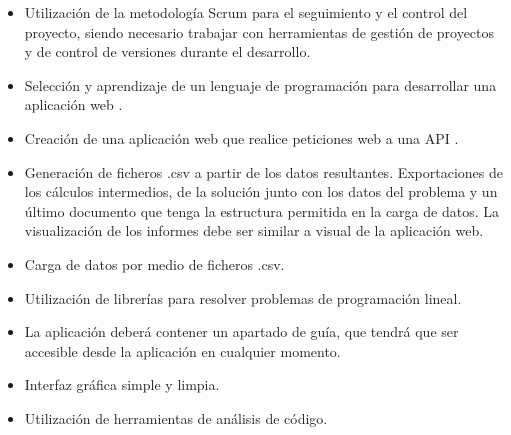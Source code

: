 \begin{itemize}
    \item Utilización de la metodología Scrum para el seguimiento y el control del proyecto, siendo necesario trabajar con herramientas de gestión de proyectos y de control de versiones durante el desarrollo.
    \item Selección y aprendizaje de un lenguaje de programación para desarrollar una aplicación web .
	\item Creación de una aplicación web que realice  peticiones web a una API .
	\item Generación de ficheros .csv a partir de los  datos resultantes. Exportaciones de los cálculos intermedios, de la solución  junto con los datos del problema y un último documento que tenga la estructura permitida en la carga de datos. La visualización de los informes debe ser similar a visual de  la aplicación web.
	\item Carga de datos por medio de ficheros .csv.
	\item Utilización de librerías para resolver problemas de programación lineal.
	\item La aplicación deberá contener un apartado de guía, que tendrá que ser accesible desde la aplicación en cualquier momento.
	\item Interfaz gráfica simple y limpia.
    \item Utilización de herramientas de análisis de código.
\end{itemize}
